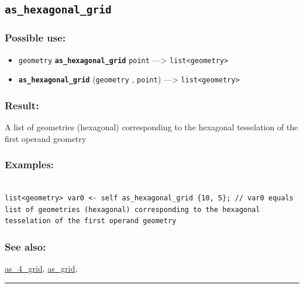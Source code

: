 \documentclass[]{book}
\providecommand{\tightlist}{%
  \setlength{\itemsep}{0pt}\setlength{\parskip}{0pt}}
\theoremstyle{definition}
\theoremstyle{definition}
\theoremstyle{definition}
\theoremstyle{remark}
\begin{document}
\subsection{\texorpdfstring{\texttt{as\_hexagonal\_grid}}{as\_hexagonal\_grid}}\label{as_hexagonal_grid}

\subsubsection{Possible use:}\label{possible-use-49}

\begin{itemize}
\tightlist
\item
  \texttt{geometry} \textbf{\texttt{as\_hexagonal\_grid}} \texttt{point}
  ---\textgreater{} \texttt{list\textless{}geometry\textgreater{}}
\item
  \textbf{\texttt{as\_hexagonal\_grid}} (\texttt{geometry} ,
  \texttt{point}) ---\textgreater{}
  \texttt{list\textless{}geometry\textgreater{}}
\end{itemize}

\subsubsection{Result:}\label{result-48}

A list of geometries (hexagonal) corresponding to the hexagonal
tesselation of the first operand geometry

\subsubsection{Examples:}\label{examples-40}

\begin{verbatim}
 
list<geometry> var0 <- self as_hexagonal_grid {10, 5}; // var0 equals list of geometries (hexagonal) corresponding to the hexagonal tesselation of the first operand geometry
\end{verbatim}

\subsubsection{See also:}\label{see-also-34}

\href{operators-a-to-a.html\#as_4_grid}{as\_4\_grid},
\href{operators-a-to-a.html\#as_grid}{as\_grid},

\begin{center}\rule{0.5\linewidth}{\linethickness}\end{center}
\end{document}

